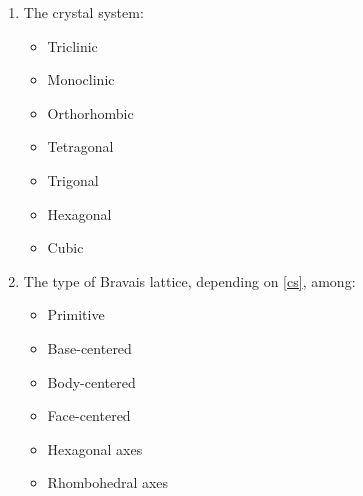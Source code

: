 \begin{enumerate}
\item\label{cs} The crystal system:\\[0.25cm]
\begin{minipage}{4cm}
 \begin{itemize}
\item Triclinic
\item Monoclinic
\end{itemize}
\end{minipage}
\begin{minipage}{4cm}
\begin{itemize}
\item Orthorhombic
\item Tetragonal
\end{itemize}
\end{minipage}
\begin{minipage}{4cm}
\begin{itemize}
\item Trigonal
\item Hexagonal
\end{itemize}
\end{minipage}
\begin{minipage}{4cm}
\begin{itemize}
\item Cubic
\end{itemize}
\end{minipage}
\item\label{bv} The type of Bravais lattice, depending on \ref{cs}, among:\\[0.25cm]
\begin{minipage}{4cm}
\begin{itemize}
\item Primitive
\item Base-centered
\end{itemize}
\end{minipage}
\begin{minipage}{4cm}
\begin{itemize}
\item Body-centered
\item Face-centered
\end{itemize}
\end{minipage}
\begin{minipage}{5cm}
\begin{itemize}
\item Hexagonal axes
\item Rhombohedral axes
\end{itemize}

\end{minipage}
\end{enumerate}
